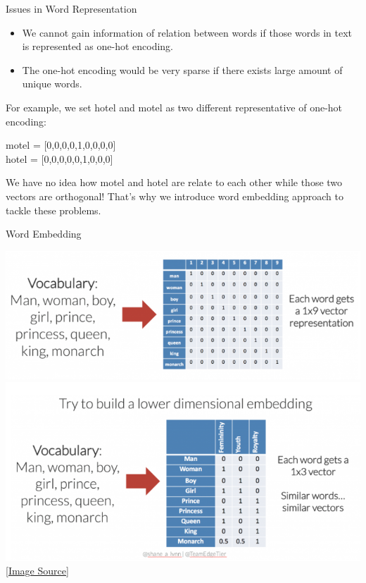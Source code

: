\begin{frame}[fragile]{Issues in Word Representation}

  \begin{itemize}
    \item We cannot gain information of relation between words if those words in text is represented as one-hot encoding.
    \item The one-hot encoding would be very sparse if there exists large amount of unique words.
  \end{itemize}

  For example, we set hotel and motel as two different representative of one-hot encoding:

  \begin{center}
    motel = [0,0,0,0,1,0,0,0,0] \\
    hotel = [0,0,0,0,0,1,0,0,0]
  \end{center}

  We have no idea how motel and hotel are relate to each other while those two vectors are orthogonal! That's why we introduce word embedding approach to tackle these problems. \cite{word2vec}

\end{frame}

\begin{frame}[fragile]{Word Embedding}

  \begin{center}
    \includegraphics[scale=0.3]{../images/img_2.png} \\
    \includegraphics[scale=0.3]{../images/img_3.png} \\
    \href{https://www.shanelynn.ie/get-busy-with-word-embeddings-introduction/}{[Image Source]}
  \end{center}



\end{frame}

